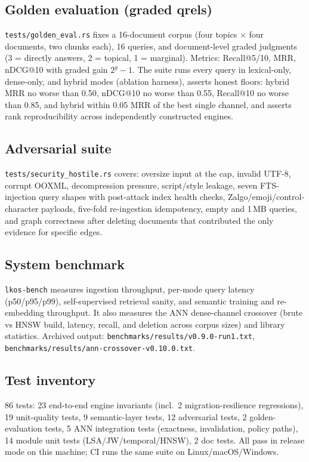\subsection{Golden evaluation (graded qrels)}\label{sec:golden}

\texttt{tests/golden\_eval.rs} fixes a 16-document corpus (four topics
$\times$ four documents, two chunks each), 16 queries, and document-level
graded judgments (3 = directly answers, 2 = topical, 1 = marginal). Metrics:
Recall@5/10, MRR, nDCG@10 with graded gain $2^{g}-1$. The suite runs every
query in lexical-only, dense-only, and hybrid modes (ablation harness),
asserts honest floors: hybrid MRR no worse than 0.50, nDCG@10 no worse than
0.55, Recall@10 no worse than 0.85, and hybrid within 0.05 MRR of the best
single channel, and asserts rank reproducibility across independently
constructed engines.

\subsection{Adversarial suite}\label{sec:adversarial}

\texttt{tests/security\_hostile.rs} covers: oversize input at the cap,
invalid UTF-8, corrupt OOXML, decompression pressure, script/style leakage,
seven FTS-injection query shapes with post-attack index health checks,
Zalgo/emoji/control-character payloads, five-fold re-ingestion idempotency,
empty and 1\,MB queries, and graph correctness after deleting documents that
contributed the only evidence for specific edges.

\subsection{System benchmark}\label{sec:bench}

\texttt{lkos-bench} measures ingestion throughput, per-mode query latency
(p50\slash p95\slash p99), self-supervised retrieval sanity, and semantic
training and re-embedding throughput. It also measures the ANN dense-channel
crossover (brute vs HNSW build, latency, recall, and deletion across corpus
sizes) and library statistics.
Archived output: \texttt{benchmarks/results/v0.9.0-run1.txt},
\texttt{benchmarks/results/ann-crossover-v0.10.0.txt}.

\subsection{Test inventory}\label{sec:tests}

86 tests: 23 end-to-end engine invariants (incl.\ 2 migration-resilience
regressions), 19 unit-quality tests, 9 semantic-layer tests, 12 adversarial
tests, 2 golden-evaluation tests, 5 ANN integration tests (exactness,
invalidation, policy paths), 14 module unit tests (LSA\slash JW\slash temporal\slash HNSW),
2 doc tests. All pass in release mode on this machine; CI runs the same suite
on Linux\slash macOS\slash Windows.
